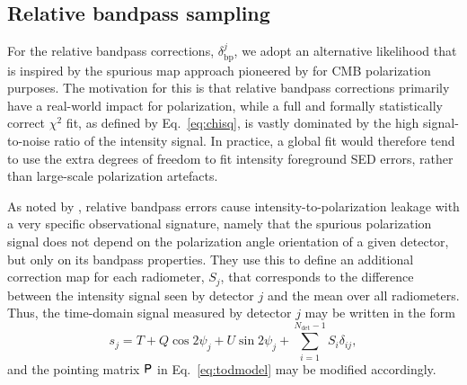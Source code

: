 \documentclass[twocolumn]{aa}
\renewcommand{\P}[0]{\tens{P}}
\newcommand{\?}[1]{\textcolor{red}{{\bf [#1]}}}
\begin{document}
\subsection{Relative bandpass sampling}

For the relative bandpass corrections, $\delta_{\mathrm{bp}}^j$, we adopt an
alternative likelihood that is inspired by the spurious map approach pioneered
by \citet{page2007} for CMB polarization purposes. The motivation for this is
that relative bandpass corrections primarily have a real-world impact for
polarization, while a full and formally statistically correct $\chi^2$ fit, as
defined by Eq.~\eqref{eq:chisq}, is vastly dominated by the high signal-to-noise
ratio of the intensity signal. In practice, a global fit would therefore tend to
use the extra degrees of freedom to fit intensity foreground SED errors, rather
than large-scale polarization artefacts. 


As noted by \citet{page2007}, relative bandpass errors cause
intensity-to-polarization leakage with a very specific observational
signature, namely that the spurious polarization signal does not depend on the
polarization angle orientation of a given detector, but only on its
bandpass properties. They use this to define an additional correction
map for each radiometer, $S_j$, that corresponds to the difference
between the intensity signal seen by detector $j$ and the mean over
all radiometers. Thus, the time-domain signal measured by detector $j$
may be written in the form
\begin{equation}
    s_{j} = T + Q\cos2\psi_j + U\sin2\psi_j +
    \sum_{i=1}^{N_{\mathrm{det}}-1}S_i \delta_{ij},
\end{equation}
and the pointing matrix $\P$ in Eq.~\eqref{eq:todmodel} may be modified
accordingly.
\end{document}
